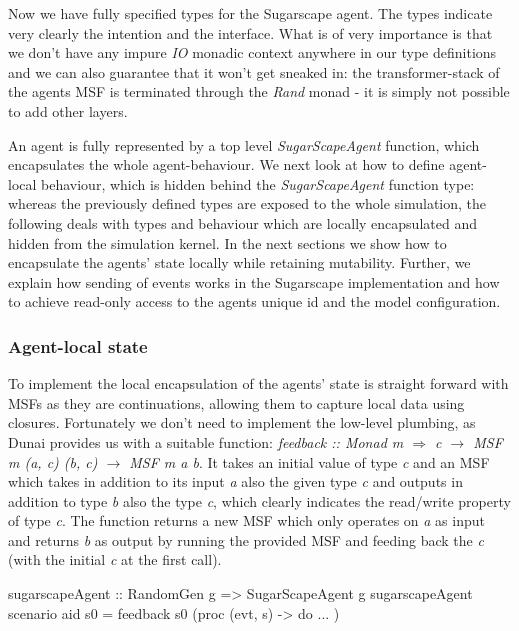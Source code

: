 Now we have fully specified types for the Sugarscape agent. The types indicate very clearly the intention and the interface. What is of very importance is that we don't have any impure \textit{IO} monadic context anywhere in our type definitions and we can also guarantee that it won't get sneaked in: the transformer-stack of the agents MSF is terminated through the \textit{Rand} monad - it is simply not possible to add other layers. 

An agent is fully represented by a top level \textit{SugarScapeAgent} function, which encapsulates the whole agent-behaviour. We next look at how to define agent-local behaviour, which is hidden behind the \textit{SugarScapeAgent} function type: whereas the previously defined types are exposed to the whole simulation, the following deals with types and behaviour which are locally encapsulated and hidden from the simulation kernel. In the next sections we show how to encapsulate the agents' state locally while retaining mutability. Further, we explain how sending of events works in the Sugarscape implementation and how to achieve read-only access to the agents unique id and the model configuration.

\subsubsection{Agent-local state}
To implement the local encapsulation of the agents' state is straight forward with MSFs as they are continuations, allowing them to capture local data using closures. Fortunately we don't need to implement the low-level plumbing, as Dunai provides us with a suitable function: \textit{feedback :: Monad m $\Rightarrow$ c $\rightarrow$ MSF m (a, c) (b, c) $\rightarrow$ MSF m a b}. It takes an initial value of type \textit{c} and an MSF which takes in addition to its input \textit{a} also the given type \textit{c} and outputs in addition to type \textit{b} also the type \textit{c}, which clearly indicates the read/write property of type \textit{c}. The function returns a new MSF which only operates on \textit{a} as input and returns \textit{b} as output by running the provided MSF and feeding back the \textit{c} (with the initial \textit{c} at the first call).

\begin{HaskellCode}
sugarscapeAgent :: RandomGen g => SugarScapeAgent g
sugarscapeAgent scenario aid s0 = feedback s0 (proc (evt, s) -> do ... )
\end{HaskellCode}


